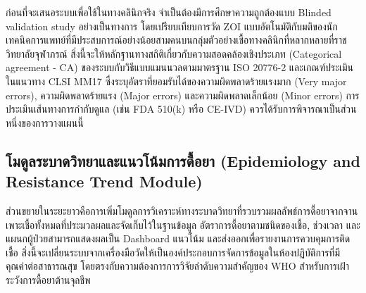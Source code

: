 ก่อนที่จะเสนอระบบเพื่อใช้ในทางคลินิกจริง จำเป็นต้องมีการศึกษาความถูกต้องแบบ Blinded validation study อย่างเป็นทางการ โดยเปรียบเทียบการวัด ZOI แบบอัตโนมัติกับมติของนักเทคนิคการแพทย์ที่มีประสบการณ์อย่างน้อยสามคนบนกลุ่มตัวอย่างเชื้อทางคลินิกที่หลากหลายที่ราชวิทยาลัยจุฬาภรณ์ สิ่งนี้จะให้หลักฐานทางสถิติเกี่ยวกับความสอดคล้องเชิงประเภท (Categorical agreement - CA) ของระบบกับวิธีแบบแมนนวลตามมาตรฐาน ISO 20776-2 \cite{iso20776_2} และเกณฑ์ประเมินในแนวทาง CLSI MM17 \cite{clsi_mm17} ซึ่งระบุอัตราที่ยอมรับได้ของความผิดพลาดร้ายแรงมาก (Very major errors), ความผิดพลาดร้ายแรง (Major errors) และความผิดพลาดเล็กน้อย (Minor errors) การประเมินเส้นทางการกำกับดูแล (เช่น FDA 510(k) หรือ CE-IVD) ควรได้รับการพิจารณาเป็นส่วนหนึ่งของการวางแผนนี้

\subsection{โมดูลระบาดวิทยาและแนวโน้มการดื้อยา (Epidemiology and Resistance Trend Module)}

ส่วนขยายในระยะยาวคือการเพิ่มโมดูลการวิเคราะห์ทางระบาดวิทยาที่รวบรวมผลลัพธ์การดื้อยาจากจานเพาะเชื้อทั้งหมดที่ประมวลผลและจัดเก็บไว้ในฐานข้อมูล อัตราการดื้อยาตามชนิดของเชื้อ, ช่วงเวลา และแผนกผู้ป่วยสามารถแสดงผลเป็น Dashboard แนวโน้ม และส่งออกเพื่อรายงานการควบคุมการติดเชื้อ สิ่งนี้จะเปลี่ยนระบบจากเครื่องมือวัดให้เป็นองค์ประกอบการจัดการข้อมูลในห้องปฏิบัติการที่มีคุณค่าต่อสาธารณสุข โดยตรงกับความต้องการการวิจัยลำดับความสำคัญของ WHO สำหรับการเฝ้าระวังการดื้อยาต้านจุลชีพ \cite{who_amr2022}
